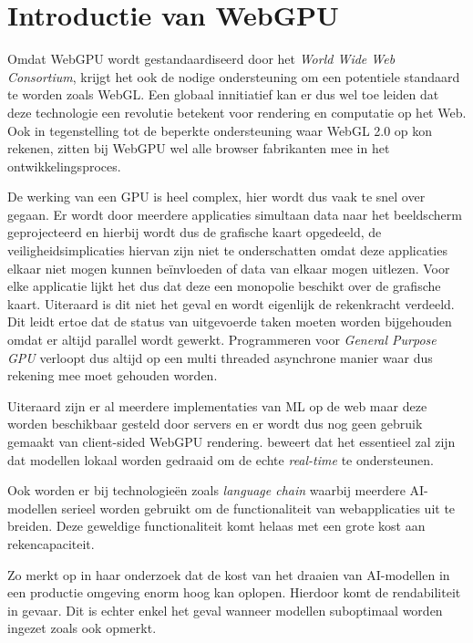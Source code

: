 \section{Introductie van WebGPU}

Omdat WebGPU wordt gestandaardiseerd door het \textit{World Wide Web Consortium}, krijgt het ook de nodige ondersteuning om een potentiele standaard te worden zoals WebGL. Een globaal innitiatief kan er dus wel toe leiden dat deze technologie een revolutie betekent voor rendering en computatie op het Web. Ook in tegenstelling tot de beperkte ondersteuning waar WebGL 2.0 op kon rekenen, zitten bij WebGPU wel alle browser fabrikanten mee in het ontwikkelingsproces. \autocite{Surma2022}

\bigbreak{}

De werking van een GPU is heel complex, hier wordt dus vaak te snel over gegaan. Er wordt door meerdere applicaties simultaan data naar het beeldscherm geprojecteerd en hierbij wordt dus de grafische kaart opgedeeld, de veiligheidsimplicaties hiervan zijn niet te onderschatten omdat deze applicaties elkaar niet mogen kunnen beïnvloeden of data van elkaar mogen uitlezen. Voor elke applicatie lijkt het dus dat deze een monopolie beschikt over de grafische kaart. Uiteraard is dit niet het geval en wordt eigenlijk de rekenkracht verdeeld. Dit leidt ertoe dat de status van uitgevoerde taken moeten worden bijgehouden omdat er altijd parallel wordt gewerkt. Programmeren voor \textit{General Purpose GPU} verloopt dus altijd op een multi threaded asynchrone manier waar dus rekening mee moet gehouden worden. \autocite{Surma2022}

\bigbreak{}

Uiteraard zijn er al meerdere implementaties van ML op de web maar deze worden beschikbaar gesteld door servers en er wordt dus nog geen gebruik gemaakt van client-sided WebGPU rendering. \textcite{Fleetwood2023a} beweert dat het essentieel zal zijn dat modellen lokaal worden gedraaid om de echte \textit{real-time} te ondersteunen.

\bigbreak{}

Ook worden er bij technologieën zoals \textit{language chain} waarbij meerdere AI-modellen serieel worden gebruikt om de functionaliteit van webapplicaties uit te breiden. Deze geweldige functionaliteit komt helaas met een grote kost aan rekencapaciteit.

\bigbreak{}

Zo merkt \textcite{Huyen2023} op in haar onderzoek dat de kost van het draaien van AI-modellen in een productie omgeving enorm hoog kan oplopen. Hierdoor komt de rendabiliteit in gevaar. Dit is echter enkel het geval wanneer modellen suboptimaal worden ingezet zoals \textcite{Fleetwood2023a} ook opmerkt.

